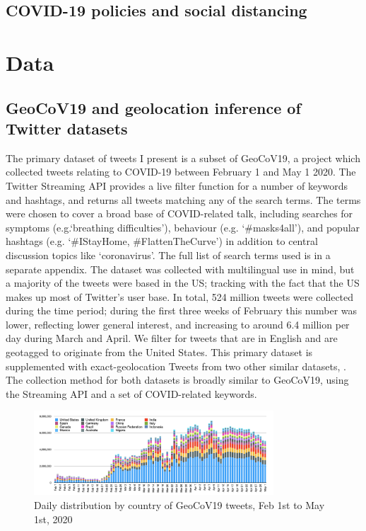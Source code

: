 \documentclass{article}
\begin{document}
\subsection{COVID-19 policies and social distancing}

\section{Data} %
\subsection{GeoCoV19 and geolocation inference of Twitter datasets}
The primary dataset of tweets I present is a subset of GeoCoV19, a project which collected tweets relating to COVID-19 between February 1 and May 1 2020. The Twitter Streaming API provides a live filter function for a number of keywords and hashtags, and returns all tweets matching any of the search terms. The terms were chosen to cover a broad base of COVID-related talk, including searches for symptoms (e.g.`breathing difficulties'), behaviour (e.g. `\#masks4all'), and popular hashtags (e.g. `\#IStayHome, \#FlattenTheCurve') in addition to central discussion topics like `coronavirus'. The full list of search terms used is in a separate appendix. The dataset was collected with multilingual use in mind, but a majority of the tweets were based in the US; tracking with the fact that the US makes up most of Twitter's user base. In total, 524 million tweets were collected during the time period; during the first three weeks of February this number was lower, reflecting lower general interest, and increasing to around 6.4 million per day during March and April. We filter for tweets that are in English and are geotagged to originate from the United States. This primary dataset is supplemented with exact-geolocation Tweets from two other similar datasets, \textcite{bandaLargescaleCOVID19Twitter2021,lamsalDesignAnalysisLargescale2020}. The collection method for both datasets is broadly similar to GeoCoV19, using the Streaming API and a set of COVID-related keywords. 
\begin{figure}[h!]
    \includegraphics[width=0.8\textwidth]{figs/GeoCov-countrydistribution.png}    
    \centering
    \caption{Daily distribution by country of GeoCoV19 tweets, Feb 1st to May 1st, 2020 \parencite{qaziGeoCoV19DatasetHundreds2020a}}
\end{figure}
\end{document}
